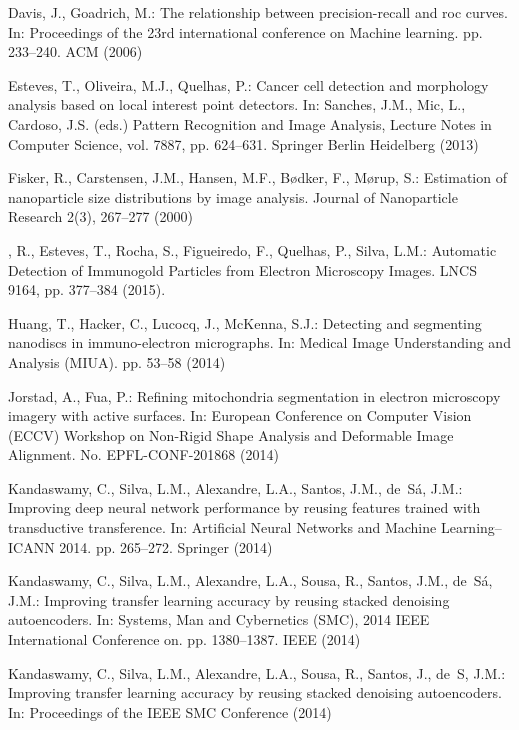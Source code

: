 \documentclass[a4paper,11pt]{article}
\newcommand{\1}{\mathbbm{1}}
\theoremstyle{plain}
\begin{document}
\begin{thebibliography}{10}
Davis, J., Goadrich, M.: The relationship between precision-recall and roc
  curves. In: Proceedings of the 23rd international conference on Machine
  learning. pp. 233--240. ACM (2006)

Esteves, T., Oliveira, M.J., Quelhas, P.: Cancer cell detection and morphology
  analysis based on local interest point detectors. In: Sanches, J.M., Mic,
  L., Cardoso, J.S. (eds.) Pattern Recognition and Image Analysis, Lecture
  Notes in Computer Science, vol. 7887, pp. 624--631. Springer Berlin
  Heidelberg (2013)

Fisker, R., Carstensen, J.M., Hansen, M.F., B{\o}dker, F., M{\o}rup, S.:
  Estimation of nanoparticle size distributions by image analysis. Journal of
  Nanoparticle Research  2(3),  267--277 (2000)

, R., Esteves, T., Rocha, S., Figueiredo, F., Quelhas, P.,
  Silva, L.M.: {Automatic Detection of Immunogold Particles from Electron
  Microscopy Images}. LNCS 9164, pp. 377--384 (2015).

Huang, T., Hacker, C., Lucocq, J., McKenna, S.J.: Detecting and segmenting
  nanodiscs in immuno-electron micrographs. In: Medical Image Understanding and
  Analysis (MIUA). pp. 53--58 (2014)

Jorstad, A., Fua, P.: Refining mitochondria segmentation in electron microscopy
  imagery with active surfaces. In: European Conference on Computer Vision
  (ECCV) Workshop on Non-Rigid Shape Analysis and Deformable Image Alignment.
  No. EPFL-CONF-201868 (2014)

Kandaswamy, C., Silva, L.M., Alexandre, L.A., Santos, J.M., de~S{\'a}, J.M.:
  Improving deep neural network performance by reusing features trained with
  transductive transference. In: Artificial Neural Networks and Machine
  Learning--ICANN 2014. pp. 265--272. Springer (2014)

Kandaswamy, C., Silva, L.M., Alexandre, L.A., Sousa, R., Santos, J.M.,
  de~S{\'a}, J.M.: Improving transfer learning accuracy by reusing stacked
  denoising autoencoders. In: Systems, Man and Cybernetics (SMC), 2014 IEEE
  International Conference on. pp. 1380--1387. IEEE (2014)

Kandaswamy, C., Silva, L.M., Alexandre, L.A., Sousa, R., Santos, J., de~S,
  J.M.: Improving transfer learning accuracy by reusing stacked denoising
  autoencoders. In: Proceedings of the IEEE SMC Conference (2014)


\end{thebibliography}
\end{document}
